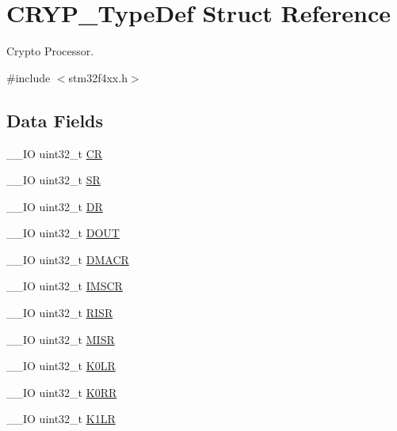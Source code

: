 \hypertarget{struct_c_r_y_p___type_def}{\section{C\-R\-Y\-P\-\_\-\-Type\-Def Struct Reference}
\label{struct_c_r_y_p___type_def}
}


Crypto Processor.  




{\ttfamily \#include $<$stm32f4xx.\-h$>$}

\subsection*{Data Fields}
\begin{DoxyCompactItemize}
\item 
\-\_\-\-\_\-\-I\-O uint32\-\_\-t \hyperlink{struct_c_r_y_p___type_def_ab40c89c59391aaa9d9a8ec011dd0907a}{C\-R}
\item 
\-\_\-\-\_\-\-I\-O uint32\-\_\-t \hyperlink{struct_c_r_y_p___type_def_af6aca2bbd40c0fb6df7c3aebe224a360}{S\-R}
\item 
\-\_\-\-\_\-\-I\-O uint32\-\_\-t \hyperlink{struct_c_r_y_p___type_def_a3df0d8dfcd1ec958659ffe21eb64fa94}{D\-R}
\item 
\-\_\-\-\_\-\-I\-O uint32\-\_\-t \hyperlink{struct_c_r_y_p___type_def_ab8ba768d1dac54a845084bd07f4ef2b9}{D\-O\-U\-T}
\item 
\-\_\-\-\_\-\-I\-O uint32\-\_\-t \hyperlink{struct_c_r_y_p___type_def_a082219a924d748e9c6092582aec06226}{D\-M\-A\-C\-R}
\item 
\-\_\-\-\_\-\-I\-O uint32\-\_\-t \hyperlink{struct_c_r_y_p___type_def_adcdd7c23a99f81c21dae2e9f989632e1}{I\-M\-S\-C\-R}
\item 
\-\_\-\-\_\-\-I\-O uint32\-\_\-t \hyperlink{struct_c_r_y_p___type_def_aa196fddf0ba7d6e3ce29bdb04eb38b94}{R\-I\-S\-R}
\item 
\-\_\-\-\_\-\-I\-O uint32\-\_\-t \hyperlink{struct_c_r_y_p___type_def_a524e134cec519206cb41d0545e382978}{M\-I\-S\-R}
\item 
\-\_\-\-\_\-\-I\-O uint32\-\_\-t \hyperlink{struct_c_r_y_p___type_def_a3ca109e86323625e5f56f92f999c3b05}{K0\-L\-R}
\item 
\-\_\-\-\_\-\-I\-O uint32\-\_\-t \hyperlink{struct_c_r_y_p___type_def_ae6d97d339f0091d4a105001ea59086ae}{K0\-R\-R}
\item 
\-\_\-\-\_\-\-I\-O uint32\-\_\-t \hyperlink{struct_c_r_y_p___type_def_a948ff2e2e97978287411fe725dd70a7f}{K1\-L\-R}

\end{DoxyCompactItemize}
